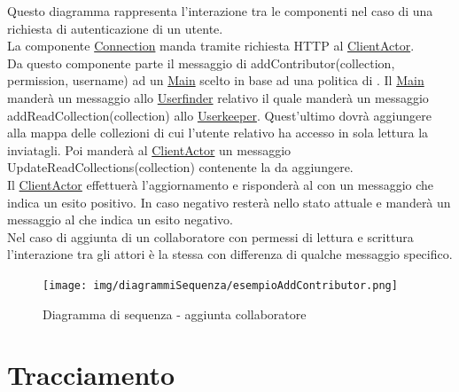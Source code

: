 \documentclass{scalatekids-article}
\begin{document}
Questo diagramma rappresenta l'interazione tra le componenti nel caso di una richiesta di autenticazione di un utente.\\
La componente \hyperref[sec:actorbase::driver::client::Connection]{Connection}
manda tramite richiesta HTTP al \hyperref[sec:actorbase::actorsystem::clientactor::ClientActor]{ClientActor}.\\
Da questo componente parte il messaggio di addContributor(collection, permission, username) ad un
\hyperref[sec:actorbase::actorsystem::main::Main]{Main} scelto in base ad una
politica di . Il \hyperref[sec:actorbase::actorsystem::main::Main]{Main} manderà un messaggio allo
\hyperref[sec:actorbase::actorsystem::userfinder]{Userfinder}
relativo il quale manderà un messaggio addReadCollection(collection) allo
\hyperref[sec:actorbase::actorsystem::userkeeper::Userkeeper]{Userkeeper}.
Quest'ultimo dovrà aggiungere alla mappa delle collezioni di cui l'utente
relativo ha accesso in sola lettura la  inviatagli.
Poi manderà al \hyperref[sec:actorbase::actorsystem::clientactor::ClientActor]{ClientActor} un messaggio UpdateReadCollections(collection)
contenente la  da aggiungere.\\
Il \hyperref[sec:actorbase::actorsystem::clientactor::ClientActor]{ClientActor} effettuerà l'aggiornamento e risponderà al 
con un messaggio che indica un esito positivo. In caso negativo resterà nello
stato attuale e manderà un messaggio al  che indica un esito
negativo.\\ Nel caso di aggiunta di un collaboratore con permessi di lettura e scrittura
l'interazione tra gli attori è la stessa con differenza di qualche messaggio
specifico.\\
\begin{figure}[H]
  \begin{center}
    \texttt{[image: img/diagrammiSequenza/esempioAddContributor.png]}
    \caption{Diagramma di sequenza - aggiunta collaboratore}
  \end{center}
\end{figure}





\section{Tracciamento}
\end{document}
